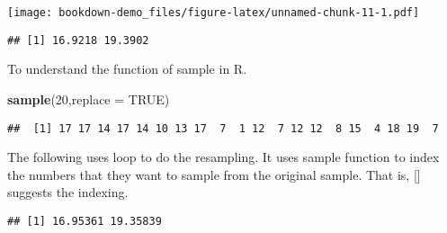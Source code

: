 \documentclass[]{book}
\newenvironment{Shaded}{\begin{snugshade}}{\end{snugshade}}
\newcommand{\ControlFlowTok}[1]{\textcolor[rgb]{0.13,0.29,0.53}{\textbf{#1}}}
\newcommand{\DataTypeTok}[1]{\textcolor[rgb]{0.13,0.29,0.53}{#1}}
\newcommand{\DecValTok}[1]{\textcolor[rgb]{0.00,0.00,0.81}{#1}}
\newcommand{\KeywordTok}[1]{\textcolor[rgb]{0.13,0.29,0.53}{\textbf{#1}}}
\newcommand{\NormalTok}[1]{#1}
\newcommand{\OperatorTok}[1]{\textcolor[rgb]{0.81,0.36,0.00}{\textbf{#1}}}
\newcommand{\OtherTok}[1]{\textcolor[rgb]{0.56,0.35,0.01}{#1}}
\newcommand{\StringTok}[1]{\textcolor[rgb]{0.31,0.60,0.02}{#1}}
\begin{document}
\texttt{[image: bookdown-demo\_files/figure-latex/unnamed-chunk-11-1.pdf]}

\begin{verbatim}
## [1] 16.9218 19.3902
\end{verbatim}

To understand the function of sample in R.

\begin{Shaded}
\begin{Highlighting}[]
\KeywordTok{sample}\NormalTok{(}\DecValTok{20}\NormalTok{,}\DataTypeTok{replace =} \OtherTok{TRUE}\NormalTok{)}
\end{Highlighting}
\end{Shaded}

\begin{verbatim}
##  [1] 17 17 14 17 14 10 13 17  7  1 12  7 12 12  8 15  4 18 19  7
\end{verbatim}

The following uses loop to do the resampling. It uses sample function to index the numbers that they want to sample from the original sample. That is, {[}{]} suggests the indexing.

\begin{Shaded}
\end{Shaded}

\begin{verbatim}
## [1] 16.95361 19.35839
\end{verbatim}
\end{document}
